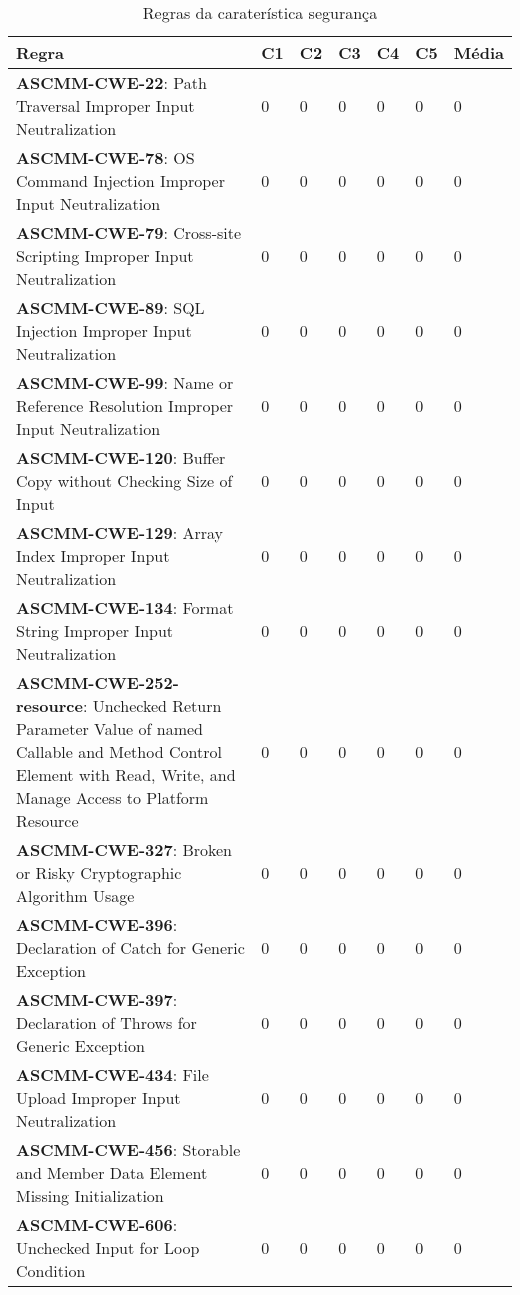 \documentclass[openany,10pt,a4paper]{article}
\begin{document}
\begin{table}[h]
	\centering
	\caption{Regras da caraterística segurança}
	\begin{tabular}{|p{3in}|p{0.3in}|p{0.3in}|p{0.3in}|p{0.3in}|p{0.3in}|p{0.4in}|}
		\hline	
		\textbf{Regra} & \textbf{C1} & \textbf{C2} & \textbf{C3} & \textbf{C4} & \textbf{C5} & \textbf{Média} \\ \hline
		\textbf{ASCMM-CWE-22}: Path Traversal Improper Input Neutralization & 0 & 0 & 0 & 0 & 0 & 0 \\ \hline
		\textbf{ASCMM-CWE-78}: OS Command Injection Improper Input Neutralization & 0 & 0 & 0 & 0 & 0 & 0 \\ \hline
		\textbf{ASCMM-CWE-79}: Cross-site Scripting Improper Input Neutralization & 0 & 0 & 0 & 0 & 0 & 0 \\ \hline
		\textbf{ASCMM-CWE-89}: SQL Injection Improper Input Neutralization & 0 & 0 & 0 & 0 & 0 & 0 \\ \hline
		\textbf{ASCMM-CWE-99}: Name or Reference Resolution Improper Input Neutralization & 0 & 0 & 0 & 0 & 0 & 0 \\ \hline
		\textbf{ASCMM-CWE-120}: Buffer Copy without Checking Size of Input & 0 & 0 & 0 & 0 & 0 & 0 \\ \hline
		\textbf{ASCMM-CWE-129}: Array Index Improper Input Neutralization & 0 & 0 & 0 & 0 & 0 & 0 \\ \hline
		\textbf{ASCMM-CWE-134}: Format String Improper Input Neutralization & 0 & 0 & 0 & 0 & 0 & 0 \\ \hline
		\textbf{ASCMM-CWE-252-resource}: Unchecked Return Parameter Value of named Callable and Method Control Element with Read, Write, and Manage Access to Platform Resource & 0 & 0 & 0 & 0 & 0 & 0 \\ \hline
		\textbf{ASCMM-CWE-327}: Broken or Risky Cryptographic Algorithm Usage & 0 & 0 & 0 & 0 & 0 & 0 \\ \hline
		\textbf{ASCMM-CWE-396}: Declaration of Catch for Generic Exception & 0 & 0 & 0 & 0 & 0 & 0 \\ \hline
		\textbf{ASCMM-CWE-397}: Declaration of Throws for Generic Exception & 0 & 0 & 0 & 0 & 0 & 0 \\ \hline
		\textbf{ASCMM-CWE-434}: File Upload Improper Input Neutralization & 0 & 0 & 0 & 0 & 0 & 0 \\ \hline
		\textbf{ASCMM-CWE-456}: Storable and Member Data Element Missing Initialization & 0 & 0 & 0 & 0 & 0 & 0 \\ \hline
		\textbf{ASCMM-CWE-606}: Unchecked Input for Loop Condition & 0 & 0 & 0 & 0 & 0 & 0 \\ \hline

\end{tabular}
\end{table}
\end{document}
